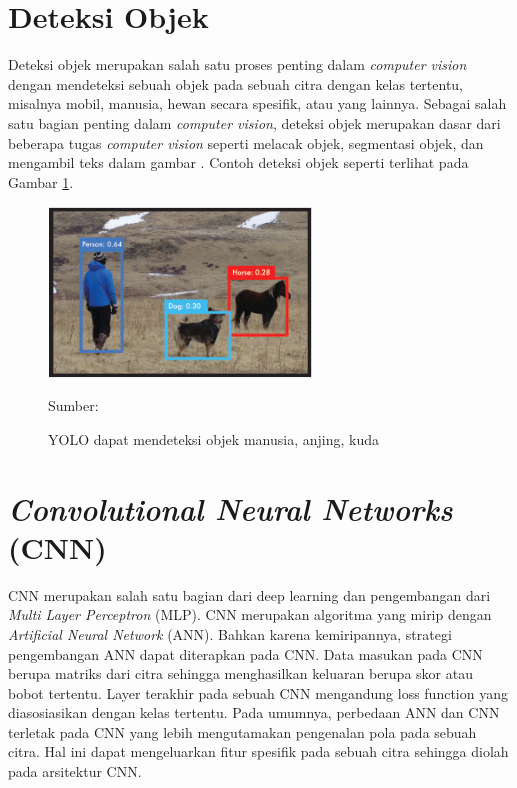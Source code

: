 \section{Deteksi Objek}
Deteksi objek merupakan salah satu proses penting dalam \textit{computer vision} dengan mendeteksi sebuah objek pada sebuah citra dengan kelas tertentu, misalnya mobil, manusia, hewan secara spesifik, atau yang lainnya. Sebagai salah satu bagian penting dalam \textit{computer vision}, deteksi objek merupakan dasar dari beberapa tugas \textit{computer vision} seperti melacak objek, segmentasi objek, dan mengambil teks dalam gambar \citep{Zou2019}. Contoh deteksi objek seperti terlihat pada Gambar \ref{fig:obj-det}.

\begin{figure}[H]
    \begin{center}
        \includegraphics[width=7cm]{../img/Object Detection - Latex.png}
        \caption{YOLO dapat mendeteksi objek manusia, anjing, kuda}
        \label{fig:obj-det}
        Sumber: \citep{Redmon2016a}
    \end{center}
\end{figure}

\section{\textit{Convolutional Neural Networks} (CNN)}
CNN merupakan salah satu bagian dari deep learning dan pengembangan dari \textit{Multi Layer Perceptron} (MLP). CNN merupakan algoritma yang mirip dengan \textit{Artificial Neural Network} (ANN). Bahkan karena kemiripannya, strategi pengembangan ANN dapat diterapkan pada CNN. Data masukan pada CNN berupa matriks dari citra sehingga menghasilkan keluaran berupa skor atau bobot tertentu. Layer terakhir pada sebuah CNN mengandung loss function yang diasosiasikan dengan kelas tertentu. Pada umumnya, perbedaan ANN dan CNN terletak pada CNN yang lebih mengutamakan pengenalan pola pada sebuah citra. Hal ini dapat mengeluarkan fitur spesifik pada sebuah citra sehingga diolah pada arsitektur CNN.

